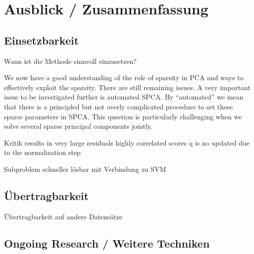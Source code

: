 \chapter{Ausblick / Zusammenfassung}

\label{conclusion}

\section{Einsetzbarkeit}
Wann ist die Methode sinnvoll einzusetzen?

We now have a good understanding of the role of
sparsity in PCA and ways to effectively exploit the sparsity.
There are still remaining issues. A very important issue to
be investigated further is automated SPCA. By “automated”
we mean that there is a principled but not overly complicated
procedure to set these sparse parameters in SPCA.
This question is particularly challenging when we solve
several sparse principal components jointly.

Kritik 
results in very large residuals
highly correlated scores
q is no updated due to the normalization step

Subproblem schneller lösbar mit Verbindung zu SVM

\section{Übertragbarkeit}
Übertragbarkeit auf andere Datensätze

\section{Ongoing Research / Weitere Techniken}